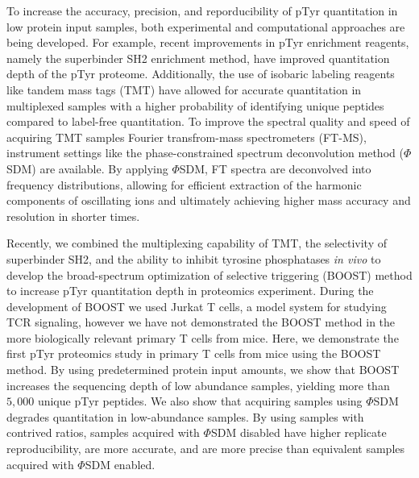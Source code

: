 \documentclass[journal=jprobs,manuscript=article]{achemso}
\begin{document}


To increase the accuracy, precision, and reporducibility of pTyr quantitation in low protein input samples, both experimental and computational approaches are being developed. For example, recent improvements in pTyr enrichment reagents, namely the superbinder SH2 enrichment method\cite{kaneko2012superbinder,bian2016ultra,dong2017sensitive,tong2017protein,yao2018sh2,yao2019one}, have improved quantitation depth of the pTyr proteome\cite{chua2020tandem,chua2021ovalbumin,griffith2021silac}. Additionally, the use of isobaric labeling reagents like tandem mass tags (TMT) have allowed for accurate quantitation in multiplexed samples with a higher probability of identifying unique peptides compared to label-free quantitation\cite{thompson2003tandem,wiese2007protein,werner2012high,mcalister2012increasing,o2018proteome,thompson2019tmtpro}. To improve the spectral quality and speed of acquiring TMT samples Fourier transfrom-mass spectrometers (FT-MS), instrument settings like the phase-constrained spectrum deconvolution method ($\Phi$SDM) are available. By applying $\Phi$SDM, FT spectra are deconvolved into frequency distributions, allowing for efficient extraction of the harmonic components of oscillating ions and ultimately achieving higher mass accuracy and resolution in shorter times\cite{grinfeld2017phase}.


Recently, we combined the multiplexing capability of TMT, the selectivity of superbinder SH2, and the ability to inhibit tyrosine phosphatases \textit{in vivo} to develop the broad-spectrum optimization of selective triggering (BOOST) method to increase pTyr quantitation depth in proteomics experiment\cite{chua2020tandem}. During the development of BOOST we used Jurkat T cells, a model system for studying TCR signaling\cite{abraham2004jurkat}, however we have not demonstrated the BOOST method in the more biologically relevant primary T cells from mice. Here, we demonstrate the first pTyr proteomics study in primary T cells from mice using the BOOST method. By using predetermined protein input amounts, we show that BOOST increases the sequencing depth of low abundance samples, yielding more than $5{,}000$ unique pTyr peptides. We also show that acquiring samples using $\Phi$SDM degrades quantitation in low-abundance samples. By using samples with contrived ratios, samples acquired with $\Phi$SDM disabled have higher replicate reproducibility, are more accurate, and are more precise than equivalent samples acquired with $\Phi$SDM enabled.
\end{document}

